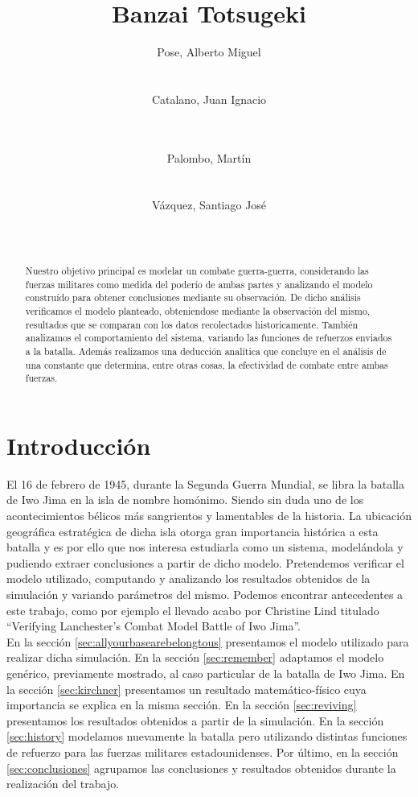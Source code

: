 \documentclass{sig-alternate}
\title{Banzai Totsugeki}
\author{
\alignauthor
Pose, Alberto Miguel\\
       \affaddr{Instituto Tecnológico de Buenos Aires}\\
       \affaddr{Buenos Aires, Argentina}\\
       \email{apose@alu.itba.edu.ar}
\alignauthor
Catalano, Juan Ignacio\\
       \affaddr{Instituto Tecnológico de Buenos Aires}\\
       \affaddr{Buenos Aires, Argentina}\\
       \email{jcatalan@alu.itba.edu.ar}
\and
\alignauthor 
Palombo, Martín\\
       \affaddr{Instituto Tecnológico de Buenos Aires}\\
       \affaddr{Buenos Aires, Argentina}\\
       \email{mpalombo@alu.itba.edu.ar}
\alignauthor 
Vázquez, Santiago José\\
       \affaddr{Instituto Tecnológico de Buenos Aires}\\
       \affaddr{Buenos Aires, Argentina}\\
       \email{savazque@alu.itba.edu.ar}
}
\date{}
\begin{document}
\maketitle

\begin{abstract}
Nuestro objetivo principal es modelar un combate guerra-guerra, considerando las fuerzas militares como medida del poder\'io de ambas partes y 
analizando el modelo constru\'ido para obtener conclusiones mediante su observaci\'on. De dicho an\'alisis verificamos el modelo planteado, obteniendose
mediante la observaci\'on del mismo, resultados que se comparan con los datos recolectados historicamente. Tambi\'en analizamos el comportamiento del sistema, 
variando las funciones de refuerzos enviados a la batalla. Adem\'as realizamos una deducci\'on anal\'itica que concluye en el análisis de una
constante que determina, entre otras cosas, la efectividad de combate entre ambas fuerzas.
\end{abstract} 

\newpage

\section{Introducci\'on}

El 16 de febrero de 1945, durante la Segunda Guerra Mundial, se libra la batalla de Iwo Jima en la isla de nombre homónimo. 
Siendo sin duda uno de los acontecimientos bélicos más sangrientos y lamentables de la historia. La ubicación geográfica estratégica de dicha
isla otorga gran importancia histórica a esta batalla y es por ello que nos interesa estudiarla como un sistema, modelándola y 
pudiendo extraer conclusiones a partir de dicho modelo. Pretendemos verificar el modelo utilizado,
computando y analizando los resultados obtenidos de la simulación y variando parámetros del mismo. Podemos encontrar antecedentes a este 
trabajo, como por ejemplo el llevado acabo por Christine Lind titulado ``Verifying Lanchester’s Combat Model Battle of Iwo Jima''. \\ 
En la secci\'on \ref{sec:allyourbasearebelongtous} presentamos el modelo utilizado para realizar dicha simulaci\'on. En la secci\'on \ref{sec:remember} 
adaptamos el modelo genérico, previamente mostrado, al caso particular de la batalla de Iwo Jima. En la sección \ref{sec:kirchner} presentamos un resultado 
matem\'atico-f\'isico cuya importancia se explica en la misma secci\'on. En la secci\'on \ref{sec:reviving} presentamos los resultados obtenidos a partir de la simulaci\'on. 
En la sección \ref{sec:history} modelamos nuevamente la batalla pero utilizando distintas funciones de refuerzo para las fuerzas militares estadounidenses.
Por \'ultimo, en la secci\'on \ref{sec:conclusiones} agrupamos las conclusiones y resultados obtenidos durante la realizaci\'on del trabajo.
\end{document}
